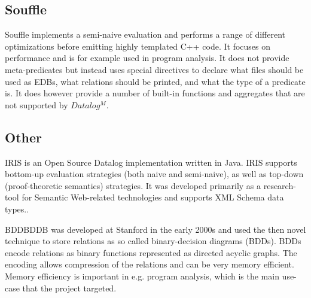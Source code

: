 \subsection{Souffle}
Souffle implements a semi-naive evaluation\cite{Green:2013:DRQ:2688167.2688168} and performs a range of different optimizations before emitting highly templated C++ code\cite{Scholz:2016:FLP:2892208.2892226}. It focuses on performance and is for example used in program analysis\cite{Smaragdakis:2010:UDF:2185923.2185939}. It does not provide meta-predicates but instead uses special directives to declare what files should be used as EDBs, what relations should be printed, and what the type of a predicate is. It does however provide a number of built-in functions and aggregates that are not supported by $Datalog^M$\cite{SouffleHome}.

\vspace*{-8pt}
\subsection{Other}
IRIS \cite{Bishop_iris-integrated}\cite{IrisGithub} is an Open Source Datalog implementation written in Java. IRIS supports bottom-up evaluation strategies (both naive and semi-naive), as well as top-down (proof-theoretic semantics) strategies\cite{IrisGithub}. It was developed primarily as a research-tool for Semantic Web-related technologies and supports XML Schema data types.\cite{XMLDataType}.

BDDBDDB\cite{Whaley:2005:UDB:2099708.2099719} was developed at Stanford in the early 2000s and used the then novel technique to store relations as so called binary-decision diagrams (BDDs). BDDs encode relations as binary functions represented as directed acyclic graphs. The encoding allows compression of the relations and can be very memory efficient. Memory efficiency is important in e.g. program analysis, which is the main use-case that the project targeted\cite{Whaley:2005:UDB:2099708.2099719}.